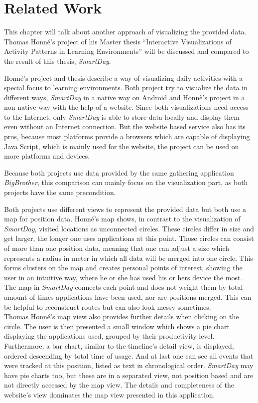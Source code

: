 \chapter{Related Work}
\label{cha:related_work}

This chapter will talk about another approach of visualizing the provided data. Thomas Honné's project of his Master thesis ``Interactive Visualizations of Activity Patterns in Learning Environments'' \cite{thomasthesis} will be discussed and compared to the result of this thesis, \emph{SmartDay}.

Honné's  project and thesis describe a way of visualizing daily activities with a special focus to learning environments. Both project try to visualize the data in different ways, \emph{SmartDay} in a native way on Android and Honnè's project in a non native way with the help of a website. Since both visualizations need access to the Internet, only \emph{SmartDay} is able to store data locally and display them even without an Internet connection. But the website based service also has its pros, because most platforms provide a browsers which are capable of displaying Java Script, which is mainly used for the website, the project can be used on more platforms and devices.

Because both projects use data provided by the same gathering application \emph{BigBrother}, this comparison can mainly focus on the visualization part, as both projects have the same precondition.

Both  projects use different views to represent the provided data but both use a map for position data. Honné's map shows, in contrast to the visualization of \emph{SmartDay}, visited locations as unconnected circles. These circles differ in size and get larger, the longer one uses applications at this point. Those circles can consist of more than one position data, meaning that one can adjust a size which represents a radius in meter in which all data will be merged into one circle. This forms clusters on the map and creates personal points of interest, showing the user in an intuitive way, where he or she has used his or hers device the most. The map in \emph{SmartDay} connects each point and does not weight them by total amount of times applications have been used, nor are positions merged. This can be helpful to reconstruct routes but can also look messy sometimes.\\
Thomas Honné's map view also provides further details when clicking on the circle. The user is then presented a small window which shows a pie chart displaying the applications used, grouped by their productivity level. Furthermore, a bar chart,  similar to the timeline's detail view, is displayed, ordered descending by total time of usage. And at last one can see all events that were tracked at this position, listed as text in chronological order. \emph{SmartDay} may have pie charts too, but these are in a separated view, not position based and are not directly accessed by the map view. The details and completeness of the website's view dominates the map view presented in this application.

